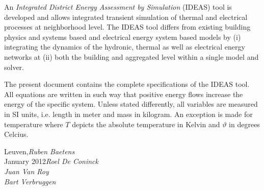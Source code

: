 %
%

\preface

An \textit{Integrated District Energy Assessment by Simulation} (IDEAS) tool is developed and allows integrated transient simulation of thermal and electrical processes at neighborhood
level. The IDEAS tool differs from existing building physics and systems based and electrical energy system based models by (i) integrating the dynamics of the hydronic, thermal as well as electrical energy networks at (ii) both the building and aggregated level within a single model and solver.

The present document contains the complete specifications of the IDEAS tool. All equations are written in such way that positive energy flows increase the energy of the specific system. Unless stated differently, all variables are measured in SI units, i.e. length in meter and mass in kilogram. An exception is made for temperature where $T$ depicts the absolute temperature in Kelvin and $\vartheta$ in degrees Celcius.
 
\vspace{\baselineskip}
\begin{flushright}\noindent
Leuven,\hfill {\it Ruben Baetens}\\
January 2012\hfill {\it Roel De Coninck}\\
 \hfill {\it Juan Van Roy}\\
 \hfill {\it Bart Verbruggen}\\
\end{flushright}


